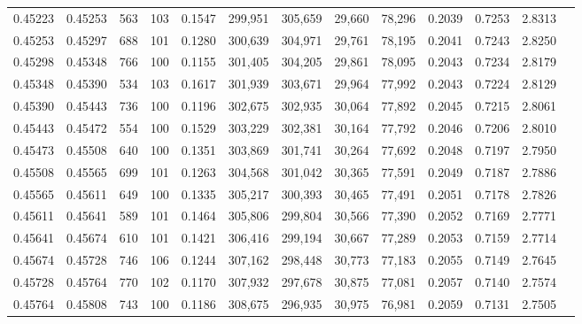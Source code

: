 \begin{tabular}{rrrrrrrrrrrrr}
0.45223 & 0.45253 &   563 & 103 &                                     0.1547 & 299,951 & 305,659 &  29,660 &  78,296 & 0.2039 & 0.7253 & 2.8313 \\
0.45253 & 0.45297 &   688 & 101 &                                     0.1280 & 300,639 & 304,971 &  29,761 &  78,195 & 0.2041 & 0.7243 & 2.8250 \\
0.45298 & 0.45348 &   766 & 100 &                                     0.1155 & 301,405 & 304,205 &  29,861 &  78,095 & 0.2043 & 0.7234 & 2.8179 \\
0.45348 & 0.45390 &   534 & 103 &                                     0.1617 & 301,939 & 303,671 &  29,964 &  77,992 & 0.2043 & 0.7224 & 2.8129 \\
0.45390 & 0.45443 &   736 & 100 &                                     0.1196 & 302,675 & 302,935 &  30,064 &  77,892 & 0.2045 & 0.7215 & 2.8061 \\
0.45443 & 0.45472 &   554 & 100 &                                     0.1529 & 303,229 & 302,381 &  30,164 &  77,792 & 0.2046 & 0.7206 & 2.8010 \\
0.45473 & 0.45508 &   640 & 100 &                                     0.1351 & 303,869 & 301,741 &  30,264 &  77,692 & 0.2048 & 0.7197 & 2.7950 \\
0.45508 & 0.45565 &   699 & 101 &                                     0.1263 & 304,568 & 301,042 &  30,365 &  77,591 & 0.2049 & 0.7187 & 2.7886 \\
0.45565 & 0.45611 &   649 & 100 &                                     0.1335 & 305,217 & 300,393 &  30,465 &  77,491 & 0.2051 & 0.7178 & 2.7826 \\
0.45611 & 0.45641 &   589 & 101 &                                     0.1464 & 305,806 & 299,804 &  30,566 &  77,390 & 0.2052 & 0.7169 & 2.7771 \\
0.45641 & 0.45674 &   610 & 101 &                                     0.1421 & 306,416 & 299,194 &  30,667 &  77,289 & 0.2053 & 0.7159 & 2.7714 \\
0.45674 & 0.45728 &   746 & 106 &                                     0.1244 & 307,162 & 298,448 &  30,773 &  77,183 & 0.2055 & 0.7149 & 2.7645 \\
0.45728 & 0.45764 &   770 & 102 &                                     0.1170 & 307,932 & 297,678 &  30,875 &  77,081 & 0.2057 & 0.7140 & 2.7574 \\
0.45764 & 0.45808 &   743 & 100 &                                     0.1186 & 308,675 & 296,935 &  30,975 &  76,981 & 0.2059 & 0.7131 & 2.7505 \\

\end{tabular}
